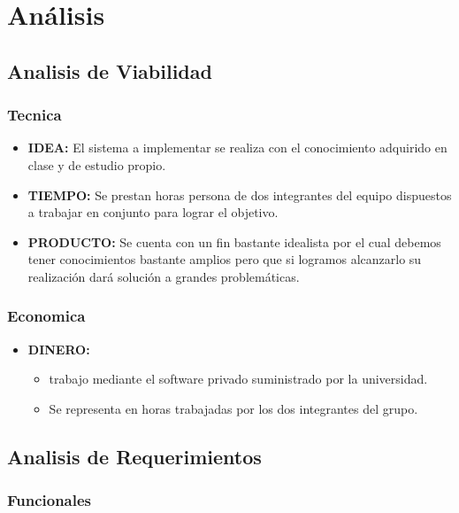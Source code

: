 \chapter{Análisis}

\section{Analisis de Viabilidad}
\subsection{Tecnica}

\begin{itemize}
	\item \textbf{IDEA: }El sistema a implementar se realiza con el conocimiento adquirido en clase y de estudio propio.
	\item \textbf{TIEMPO: }Se prestan horas persona de dos integrantes del equipo dispuestos a trabajar en conjunto para lograr el objetivo.
	\item \textbf{PRODUCTO: }Se cuenta con un fin bastante idealista por el cual debemos tener conocimientos bastante amplios pero que si logramos alcanzarlo su realización dará solución a grandes problemáticas.

\end{itemize}

\subsection{Economica}



\begin{itemize}
	\item \textbf{DINERO: }
	\begin{itemize}
		\item trabajo mediante el software privado suministrado por la universidad.
		\item Se representa en horas trabajadas por los dos integrantes del grupo.
		
	\end{itemize}
	
\end{itemize}

\clearpage
\newpage
\section{Analisis de Requerimientos}

\subsection{Funcionales}

